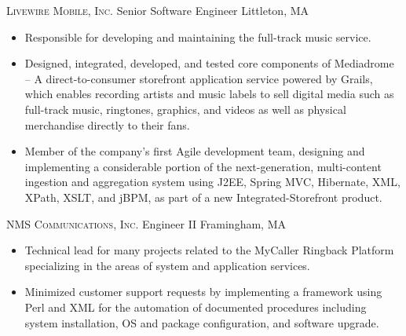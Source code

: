 \documentclass[11pt,letterpaper,roman]{moderncv} %
\begin{document}
		{\textsc{Livewire Mobile, Inc.}}		{Senior Software Engineer}				{Littleton, MA}		{}
	{
	\begin{itemize}
		\item Responsible for developing and maintaining the full-track music service.
		\item Designed, integrated, developed, and tested core components of Mediadrome -- A direct-to-consumer storefront application service powered by Grails, which enables recording artists and music labels to sell digital media such as full-track music, ringtones, graphics, and videos as well as physical merchandise directly to their fans.
		\item Member of the company's first Agile development team, designing and implementing a considerable portion of the next-generation, multi-content ingestion and aggregation system using J2EE, Spring MVC, Hibernate, XML, XPath, XSLT, and jBPM, as part of a new Integrated-Storefront product. 
	\end{itemize}
	}


		{\textsc{NMS Communications, Inc.}}		{Engineer II}							{Framingham, MA}	{}
	{
	\begin{itemize}
		\item Technical lead for many projects related to the MyCaller Ringback Platform specializing in the areas of system and application services.
		\item Minimized customer support requests by implementing a framework using Perl and XML for the automation of documented procedures including system installation, OS and package configuration, and software upgrade.
	\end{itemize}
	}

\end{document}
